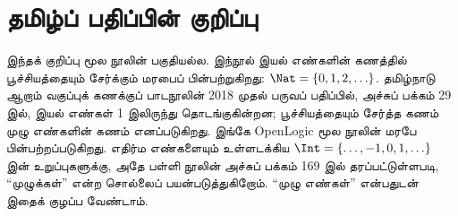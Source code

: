 \section*{தமிழ்ப் பதிப்பின் குறிப்பு}
இந்தக் குறிப்பு மூல நூலின் பகுதியல்ல.
இந்நூல் இயல் எண்களின் கணத்தில் பூச்சியத்தையும் சேர்க்கும் மரபைப்
பின்பற்றுகிறது: $\Nat=\{0,1,2,\ldots\}$. தமிழ்நாடு ஆறாம் வகுப்புக்
கணக்குப் பாடநூலின் 2018 முதல் பருவப் பதிப்பில், அச்சுப் பக்கம் 29 இல்,
இயல் எண்கள் 1 இலிருந்து தொடங்குகின்றன; பூச்சியத்தையும் சேர்த்த கணம்
முழு எண்களின் கணம் எனப்படுகிறது. இங்கே OpenLogic மூல நூலின்
மரபே பின்பற்றப்படுகிறது. எதிர்ம எண்களையும் உள்ளடக்கிய
$\Int=\{\ldots,-1,0,1,\ldots\}$ இன் உறுப்புகளுக்கு, அதே பள்ளி நூலின்
அச்சுப் பக்கம் 169 இல் தரப்பட்டுள்ளபடி, “முழுக்கள்” என்ற சொல்லைப்
பயன்படுத்துகிறோம். “முழு எண்கள்” என்பதுடன் இதைக் குழப்ப வேண்டாம்.
